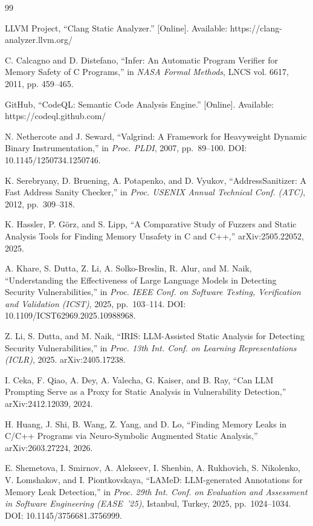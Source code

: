 \documentclass[a4paper]{llncs}
\begin{document}
\footnotesize
\begin{thebibliography}{99}

 LLVM Project, ``Clang Static Analyzer.'' [Online]. Available: https://clang-analyzer.llvm.org/

 C. Calcagno and D. Distefano, ``Infer: An Automatic Program Verifier for Memory Safety of C Programs,'' in \textit{NASA Formal Methods}, LNCS vol. 6617, 2011, pp. 459--465.

 GitHub, ``CodeQL: Semantic Code Analysis Engine.'' [Online]. Available: https://codeql.github.com/

 N. Nethercote and J. Seward, ``Valgrind: A Framework for Heavyweight Dynamic Binary Instrumentation,'' in \textit{Proc. PLDI}, 2007, pp.~89--100. DOI: 10.1145/1250734.1250746.

 K. Serebryany, D. Bruening, A. Potapenko, and D. Vyukov, ``AddressSanitizer: A Fast Address Sanity Checker,'' in \textit{Proc. USENIX Annual Technical Conf. (ATC)}, 2012, pp.~309--318.

 K. Hassler, P. G\"{o}rz, and S. Lipp, ``A Comparative Study of Fuzzers and Static Analysis Tools for Finding Memory Unsafety in C and C++,'' arXiv:2505.22052, 2025.

 A. Khare, S. Dutta, Z. Li, A. Solko-Breslin, R. Alur, and M. Naik, ``Understanding the Effectiveness of Large Language Models in Detecting Security Vulnerabilities,'' in \textit{Proc. IEEE Conf. on Software Testing, Verification and Validation (ICST)}, 2025, pp.~103--114. DOI: 10.1109/ICST62969.2025.10988968.

 Z. Li, S. Dutta, and M. Naik, ``IRIS: LLM-Assisted Static Analysis for Detecting Security Vulnerabilities,'' in \textit{Proc. 13th Int. Conf. on Learning Representations (ICLR)}, 2025. arXiv:2405.17238.

 I. Ceka, F. Qiao, A. Dey, A. Valecha, G. Kaiser, and B. Ray, ``Can LLM Prompting Serve as a Proxy for Static Analysis in Vulnerability Detection,'' arXiv:2412.12039, 2024.

 H. Huang, J. Shi, B. Wang, Z. Yang, and D. Lo, ``Finding Memory Leaks in C/C++ Programs via Neuro-Symbolic Augmented Static Analysis,'' arXiv:2603.27224, 2026.

 E. Shemetova, I. Smirnov, A. Alekseev, I. Shenbin, A. Rukhovich, S. Nikolenko, V. Lomshakov, and I. Piontkovskaya, ``LAMeD: LLM-generated Annotations for Memory Leak Detection,'' in \textit{Proc. 29th Int. Conf. on Evaluation and Assessment in Software Engineering (EASE~'25)}, Istanbul, Turkey, 2025, pp.~1024--1034. DOI: 10.1145/3756681.3756999.


\end{thebibliography}
\end{document}
